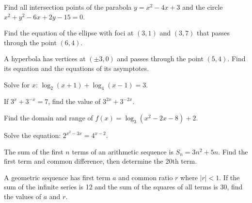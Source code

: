 \documentclass[12pt]{exam}
\begin{document}
\begin{questions}
\newpage


\question[9]
Find all intersection points of the parabola $y = x^2 - 4x + 3$ and the circle $x^2 + y^2 - 6x + 2y - 15 = 0$.
\vspace*{6cm}

\question[8]
Find the equation of the ellipse with foci at $(3, 1)$ and $(3, 7)$ that passes through the point $(6, 4)$.
\vspace*{6cm}

\question[8]
A hyperbola has vertices at $(\pm 3, 0)$ and passes through the point $(5, 4)$. Find its equation and the equations of its asymptotes.
\vspace*{6cm}


\question[8]
Solve for $x$: $\log_2(x+1) + \log_4(x-1) = 3$.
\vspace*{5cm}

\question[9]
If $3^x + 3^{-x} = 7$, find the value of $3^{2x} + 3^{-2x}$.
\vspace*{6cm}

\question[8]
Find the domain and range of $f(x) = \log_3(x^2 - 2x - 8) + 2$.
\vspace*{5cm}

\question[8]
Solve the equation: $2^{x^2-3x} = 4^{x-2}$.
\vspace*{5cm}

\newpage


\question[9]
The sum of the first $n$ terms of an arithmetic sequence is $S_n = 3n^2 + 5n$. Find the first term and common difference, then determine the 20th term.
\vspace*{6cm}

\question[10]
A geometric sequence has first term $a$ and common ratio $r$ where $|r| < 1$. If the sum of the infinite series is 12 and the sum of the squares of all terms is 30, find the values of $a$ and $r$.


\end{questions}
\end{document}
